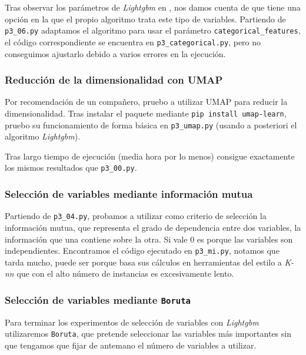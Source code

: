 \documentclass[a4paper, 20pt]{article}
\begin{document}
Tras observar los parámetros de \textit{Lightgbm} en \cite{noauthor_parameters_nodate-1}, nos damos cuenta de que tiene una opción en la que el propio algoritmo trata este tipo de variables. Partiendo de \texttt{p3\_06.py} adaptamos el algoritmo para usar el parámetro \texttt{categorical\_features}, el código correspondiente se encuentra en \texttt{p3\_categorical.py}, pero no conseguimos ajustarlo debido a varios errores en la ejecución.

\subsubsection{Reducción de la dimensionalidad con UMAP}
Por recomendación de un compañero, pruebo a utilizar UMAP \cite{noauthor_umap:_nodate} para reducir la dimensionalidad. Tras instalar el paquete mediante \texttt{pip install umap-learn}, pruebo su funcionamiento de forma básica en \texttt{p3\_umap.py} (usando a posteriori el algoritmo \textit{Lightgbm}).

Tras largo tiempo de ejecución (media hora por lo menos) consigue exactamente los mismos resultados que \texttt{p3\_00.py}.

\subsubsection{Selección de variables mediante información mutua}
Partiendo de \texttt{p3\_04.py}, probamos a utilizar como criterio de selección la información mutua, que representa el grado de dependencia entre dos variables, la información que una contiene sobre la otra. Si vale 0 es porque las variables son independientes. Encontramos el código ejecutado en \texttt{p3\_mi.py},
notamos que tarda mucho, puede ser porque basa sus cálculos en herramientas del estilo a \textit{K-nn} que con el alto número de instancias es excesivamente lento.

\subsubsection{Selección de variables mediante \texttt{Boruta}}
Para terminar los experimentos de selección de variables con \textit{Lightgbm} utilizaremos \texttt{Boruta}, que pretende seleccionar las variables más importantes sin que tengamos que fijar de antemano el número de variables a utilizar.
\end{document}
